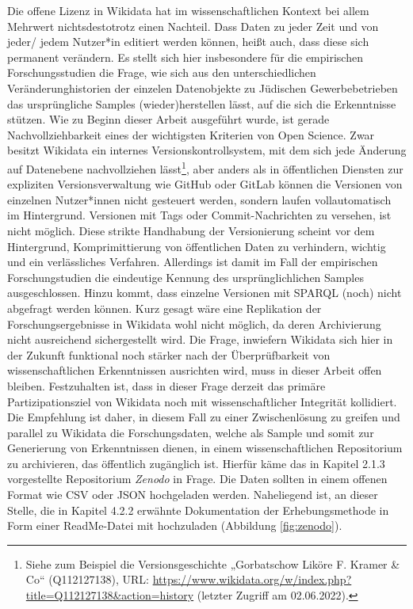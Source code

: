 Die offene Lizenz in Wikidata hat im wissenschaftlichen Kontext bei allem Mehrwert nichtsdestotrotz einen Nachteil. Dass Daten zu jeder Zeit und von jeder/ jedem Nutzer*in editiert werden können, heißt auch, dass diese sich permanent verändern. Es stellt sich hier insbesondere für die empirischen Forschungsstudien die Frage, wie sich aus den unterschiedlichen Veränderunghistorien der einzelen Datenobjekte zu Jüdischen Gewerbebetrieben das ursprüngliche Samples (wieder)herstellen lässt, auf die sich die Erkenntnisse stützen. Wie zu Beginn dieser Arbeit ausgeführt wurde, ist gerade Nachvollziehbarkeit eines der wichtigsten Kriterien von Open Science. Zwar besitzt Wikidata ein internes Versionskontrollsystem, mit dem sich jede Änderung auf Datenebene nachvollziehen lässt\footnote{Siehe zum Beispiel die Versionsgeschichte „Gorbatschow Liköre F. Kramer \& Co“ (Q112127138), URL: \url{https://www.wikidata.org/w/index.php?title=Q112127138&action=history} (letzter Zugriff am 02.06.2022).}, aber anders als in öffentlichen Diensten zur expliziten Versionsverwaltung wie GitHub oder GitLab können die Versionen von einzelnen Nutzer*innen nicht gesteuert werden, sondern laufen vollautomatisch im Hintergrund. Versionen mit Tags oder Commit-Nachrichten zu versehen, ist nicht möglich. Diese strikte Handhabung der Versionierung scheint vor dem Hintergrund, Komprimittierung von öffentlichen Daten zu verhindern, wichtig und ein verlässliches Verfahren. Allerdings ist damit im Fall der empirischen Forschungstudien die eindeutige Kennung des ursprünglichlichen Samples ausgeschlossen. Hinzu kommt, dass einzelne Versionen mit SPARQL (noch) nicht abgefragt werden können. Kurz gesagt wäre eine Replikation der Forschungsergebnisse in Wikidata wohl nicht möglich, da deren Archivierung nicht ausreichend sichergestellt wird. Die Frage, inwiefern Wikidata sich hier in der Zukunft funktional noch stärker nach der Überprüfbarkeit von wissenschaftlichen Erkenntnissen ausrichten wird, muss in dieser Arbeit offen bleiben. Festzuhalten ist, dass in dieser Frage derzeit das primäre Partizipationsziel von Wikidata noch mit wissenschaftlicher Integrität kollidiert. Die Empfehlung ist daher, in diesem Fall zu einer Zwischenlösung zu greifen und parallel zu Wikidata die Forschungsdaten, welche als Sample und somit zur Generierung von Erkenntnissen dienen, in einem wissenschaftlichen Repositorium zu archivieren, das öffentlich zugänglich ist. Hierfür käme das in Kapitel 2.1.3 vorgestellte Repositorium \textit{Zenodo} in Frage. Die Daten sollten in einem offenen Format wie CSV oder JSON hochgeladen werden. Naheliegend ist, an dieser Stelle, die in Kapitel 4.2.2 erwähnte Dokumentation der Erhebungsmethode in Form einer ReadMe-Datei mit hochzuladen (Abbildung \ref{fig:zenodo}).

